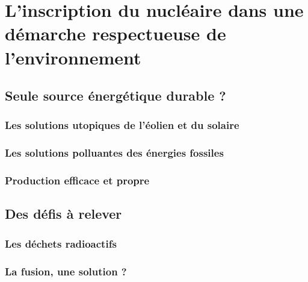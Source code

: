 

\chapter{L'inscription du nucléaire dans une démarche respectueuse de l'environnement}

\section{Seule source énergétique durable ?}

\subsection{Les solutions utopiques de l'éolien et du solaire}

\subsection{Les solutions polluantes des énergies fossiles}

\subsection{Production efficace et propre}

\section{Des défis à relever}

\subsection{Les déchets radioactifs}

\subsection{La fusion, une solution ?}
